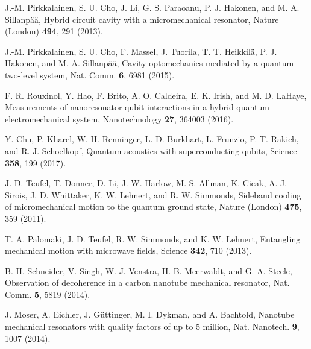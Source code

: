 \documentclass[aps,twocolumn,groupedaddress,superscriptaddress,floatfix,amsmath,amssymb,prb]{revtex4-1}
\begin{document}
\begin{thebibliography}{99}
J.-M. Pirkkalainen, S. U. Cho, J. Li, G. S. Paraoanu, P. J. Hakonen, and M. A. Sillanp\"{a}\"{a}, 
{Hybrid circuit cavity with a micromechanical resonator}, 
Nature (London) \textbf{494}, 291 (2013).

J.-M. Pirkkalainen, S. U. Cho, F. Massel, J. Tuorila, T. T. Heikkil\"{a}, P. J. Hakonen, and M. A. Sillanp\"{a}\"{a}, 
{Cavity optomechanics mediated by a quantum two-level system}, 
Nat. Comm. \textbf{6}, 6981 (2015).

F. R. Rouxinol, Y. Hao, F. Brito, A. O. Caldeira, E. K. Irish, and M. D. LaHaye, 
{Measurements of nanoresonator-qubit interactions in a hybrid quantum electromechanical system}, 
Nanotechnology \textbf{27}, 364003 (2016). 

Y. Chu, P. Kharel, W. H. Renninger, L. D. Burkhart, L. Frunzio, P. T. Rakich, and R. J. Schoelkopf,
Quantum acoustics with superconducting qubits,
Science {\bf 358}, 199 (2017).

 J. D. Teufel, T. Donner, D. Li, J. W. Harlow, M. S. Allman, K. Cicak, A. J. Sirois, J. D. Whittaker, K. W. Lehnert, and R. W. Simmonds,
{Sideband cooling of micromechanical motion to the quantum ground state},
Nature (London) \textbf{475}, 359 (2011).

T. A. Palomaki, J. D. Teufel, R. W. Simmonds, and K. W. Lehnert, 
{Entangling mechanical motion with microwave fields}, 
Science \textbf{342}, 710 (2013).

B. H. Schneider, V. Singh, W. J. Venstra, H. B. Meerwaldt, and G. A. Steele, 
{Observation of decoherence in a carbon nanotube mechanical resonator}, 
Nat. Comm. \textbf{5}, 5819 (2014).

J. Moser, A. Eichler, J. G\"{u}ttinger, M. I. Dykman, and A. Bachtold,
{Nanotube mechanical resonators with quality factors of up to 5 million}, 
Nat. Nanotech. \textbf{9}, 1007 (2014).


\end{thebibliography}
\end{document}
